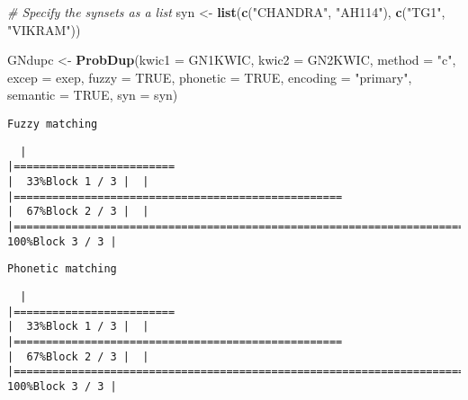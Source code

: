 \documentclass[
]{article}
\newenvironment{Shaded}{\begin{snugshade}}{\end{snugshade}}
\newcommand{\CommentTok}[1]{\textcolor[rgb]{0.56,0.35,0.01}{\textit{#1}}}
\newcommand{\DataTypeTok}[1]{\textcolor[rgb]{0.13,0.29,0.53}{#1}}
\newcommand{\KeywordTok}[1]{\textcolor[rgb]{0.13,0.29,0.53}{\textbf{#1}}}
\newcommand{\NormalTok}[1]{#1}
\newcommand{\OtherTok}[1]{\textcolor[rgb]{0.56,0.35,0.01}{#1}}
\newcommand{\StringTok}[1]{\textcolor[rgb]{0.31,0.60,0.02}{#1}}
\begin{document}
\begin{Shaded}
\begin{Highlighting}[]
\CommentTok{# Specify the synsets as a list}
\NormalTok{syn <-}\StringTok{ }\KeywordTok{list}\NormalTok{(}\KeywordTok{c}\NormalTok{(}\StringTok{"CHANDRA"}\NormalTok{, }\StringTok{"AH114"}\NormalTok{), }\KeywordTok{c}\NormalTok{(}\StringTok{"TG1"}\NormalTok{, }\StringTok{"VIKRAM"}\NormalTok{))}
\end{Highlighting}
\end{Shaded}

\begin{Shaded}
\begin{Highlighting}[]
\NormalTok{GNdupc <-}\StringTok{ }\KeywordTok{ProbDup}\NormalTok{(}\DataTypeTok{kwic1 =}\NormalTok{ GN1KWIC, }\DataTypeTok{kwic2 =}\NormalTok{ GN2KWIC, }\DataTypeTok{method =} \StringTok{"c"}\NormalTok{,}
                  \DataTypeTok{excep =}\NormalTok{ exep, }\DataTypeTok{fuzzy =} \OtherTok{TRUE}\NormalTok{, }\DataTypeTok{phonetic =} \OtherTok{TRUE}\NormalTok{,}
                  \DataTypeTok{encoding =} \StringTok{"primary"}\NormalTok{, }\DataTypeTok{semantic =} \OtherTok{TRUE}\NormalTok{, }\DataTypeTok{syn =}\NormalTok{ syn)}
\end{Highlighting}
\end{Shaded}

\begin{verbatim}
Fuzzy matching
\end{verbatim}

\begin{verbatim}
  |                                                                                    |=========================                                                   |  33%Block 1 / 3 |  |                                                                                    |===================================================                         |  67%Block 2 / 3 |  |                                                                                    |============================================================================| 100%Block 3 / 3 |
\end{verbatim}

\begin{verbatim}
Phonetic matching
\end{verbatim}

\begin{verbatim}
  |                                                                                    |=========================                                                   |  33%Block 1 / 3 |  |                                                                                    |===================================================                         |  67%Block 2 / 3 |  |                                                                                    |============================================================================| 100%Block 3 / 3 |
\end{verbatim}
\end{document}
